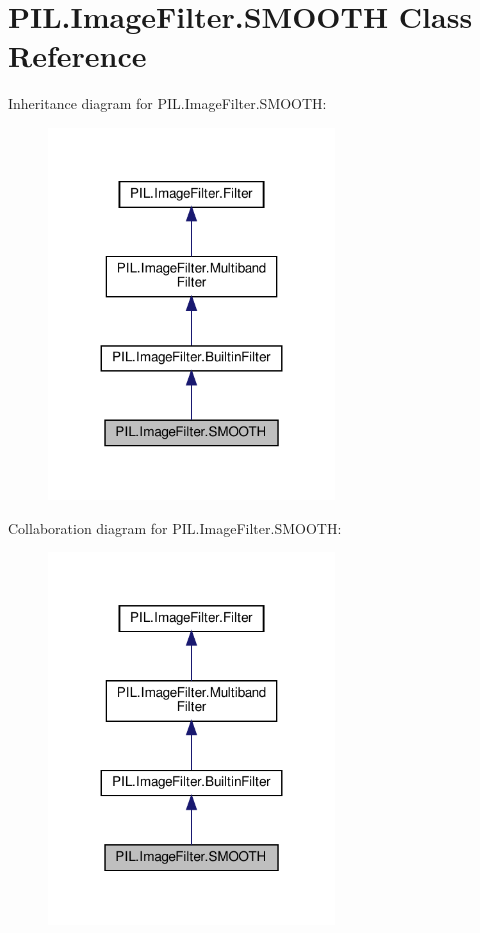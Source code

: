 \hypertarget{classPIL_1_1ImageFilter_1_1SMOOTH}{}\section{P\+I\+L.\+Image\+Filter.\+S\+M\+O\+O\+TH Class Reference}
\label{classPIL_1_1ImageFilter_1_1SMOOTH}


Inheritance diagram for P\+I\+L.\+Image\+Filter.\+S\+M\+O\+O\+TH\+:
\nopagebreak
\begin{figure}[H]
\begin{center}
\leavevmode
\includegraphics[width=215pt]{classPIL_1_1ImageFilter_1_1SMOOTH__inherit__graph}
\end{center}
\end{figure}


Collaboration diagram for P\+I\+L.\+Image\+Filter.\+S\+M\+O\+O\+TH\+:
\nopagebreak
\begin{figure}[H]
\begin{center}
\leavevmode
\includegraphics[width=215pt]{classPIL_1_1ImageFilter_1_1SMOOTH__coll__graph}
\end{center}
\end{figure}
